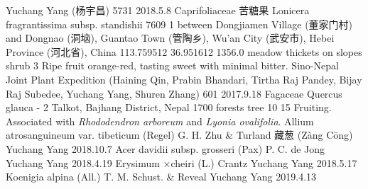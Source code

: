 \documentclass[autoduplicate]{nanicolle}
\begin{document}
	Yuchang Yang (杨宇昌)	5731	2018.5.8	Caprifoliaceae	苦糖果	Lonicera fragrantissima subsp. standishii	7609	1	between Dongjiamen Village (董家门村) and Dongnao (洞垴), Guantao Town (管陶乡), Wu'an City (武安市), Hebei Province (河北省), China	113.759512	36.951612	1356.0	meadow thickets on slopes	shrub	3		Ripe fruit orange-red, tasting sweet with minimal bitter.
	Sino-Nepal Joint Plant Expedition (Haining Qin, Prabin Bhandari, Tirtha Raj Pandey, Bijay Raj Subedee, Yuchang Yang, Shuren Zhang)	601	2017.9.18	Fagaceae		Quercus glauca	-	2	Talkot, Bajhang District, Nepal			1700	forests	tree	10	15	Fruiting. Associated with \textit{Rhododendron arboreum} and \textit{Lyonia ovalifolia}.			
	Allium atrosanguineum var. tibeticum (Regel) G. H. Zhu & Turland	藏葱 (Z\`ang C\=ong)	Yuchang Yang		2018.10.7	
	Acer davidii subsp. grosseri (Pax) P. C. de Jong		Yuchang Yang		2018.4.19	
	Erysimum ×cheiri (L.) Crantz		Yuchang Yang		2018.5.17	
	Koenigia alpina (All.) T. M. Schust. & Reveal		Yuchang Yang		2019.4.13	
\end{document}
